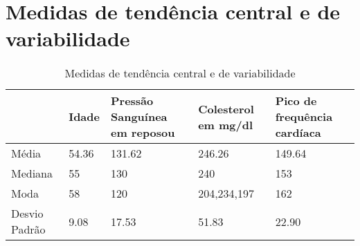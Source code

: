\chapter{Medidas de tendência central e de variabilidade}

    \begin{table}[htb]
      \caption{Medidas de tendência central e de variabilidade}
      \centering
      \begin{tabular}{ |P{2.8cm} |P{2cm}|P{3cm}|P{3cm}|P{3cm}|  }
        \hline
          & Idade & Pressão Sanguínea em reposou & Colesterol em mg/dl & Pico de frequência cardíaca\\
        \hline
        Média & 54.36 & 131.62 & 246.26 & 149.64 \\
        \hline
        Mediana & 55 & 130 & 240 & 153 \\
        \hline
        Moda & 58 & 120 & 204,234,197 & 162 \\
        \hline
        Desvio Padrão & 9.08 & 17.53 & 51.83 & 22.90 \\
        \hline
      \end{tabular}
    \end{table}

